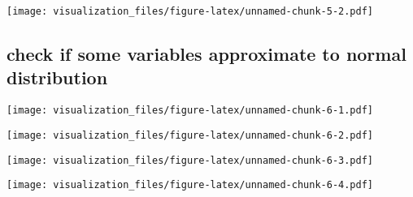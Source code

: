 \documentclass[
]{article}
\newenvironment{Shaded}{\begin{snugshade}}{\end{snugshade}}
\newcommand{\CommentTok}[1]{\textcolor[rgb]{0.56,0.35,0.01}{\textit{#1}}}
\newcommand{\FunctionTok}[1]{\textcolor[rgb]{0.00,0.00,0.00}{#1}}
\newcommand{\NormalTok}[1]{#1}
\newcommand{\SpecialCharTok}[1]{\textcolor[rgb]{0.00,0.00,0.00}{#1}}
\begin{document}
\texttt{[image: visualization\_files/figure-latex/unnamed-chunk-5-2.pdf]}

\hypertarget{check-if-some-variables-approximate-to-normal-distribution}{%
\subsection{check if some variables approximate to normal
distribution}\label{check-if-some-variables-approximate-to-normal-distribution}}

\begin{Shaded}
\end{Shaded}

\texttt{[image: visualization\_files/figure-latex/unnamed-chunk-6-1.pdf]}

\begin{Shaded}
\end{Shaded}

\texttt{[image: visualization\_files/figure-latex/unnamed-chunk-6-2.pdf]}

\begin{Shaded}
\end{Shaded}

\texttt{[image: visualization\_files/figure-latex/unnamed-chunk-6-3.pdf]}

\begin{Shaded}
\end{Shaded}

\texttt{[image: visualization\_files/figure-latex/unnamed-chunk-6-4.pdf]}

\begin{Shaded}
\end{Shaded}
\end{document}
